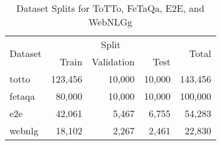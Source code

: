 \begin{table}[h]
\centering
\caption{Dataset Splits for ToTTo, FeTaQa, E2E, and WebNLGg}
\label{tab:dataset-splits}
\begin{tabular}{lrrrr}
\toprule
\multirow{2}{*}{Dataset} & \multicolumn{3}{c}{Split} & \multirow{2}{*}{Total} \\
\cmidrule(lr){2-4}
& Train & Validation & Test & \\
\midrule
totto & 123,456 & 10,000 & 10,000 & 143,456 \\
fetaqa & 80,000 & 10,000 & 10,000 & 100,000 \\
e2e & 42,061 & 5,467 & 6,755 & 54,283 \\
webnlg & 18,102 & 2,267 & 2,461 & 22,830 \\
\bottomrule
\end{tabular}
\end{table}
